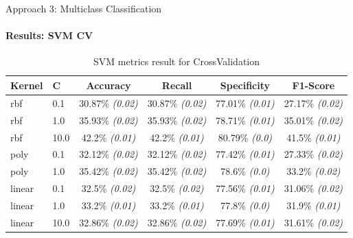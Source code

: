 \documentclass[9pt, pstricks, xcolor=dvipsnames]{beamer}
\begin{document}
\begin{frame}{Approach 3: Multiclass Classification}
\framesubtitle{Results: SVM CV}
\begin{table}[H]
\centering
\begin{tabular}{llcccc}
\toprule
Kernel & C & Accuracy & Recall & Specificity & F1-Score \\
\midrule
rbf & 0.1 & 30.87\% \textit{(0.02)} & 30.87\% \textit{(0.02)} & 77.01\% \textit{(0.01)} & 27.17\% \textit{(0.02)} \\
rbf & 1.0 & 35.93\% \textit{(0.02)} & 35.93\% \textit{(0.02)} & 78.71\% \textit{(0.01)} & 35.01\% \textit{(0.02)} \\
rbf & 10.0 & 42.2\% \textit{(0.01)} & 42.2\% \textit{(0.01)} & 80.79\% \textit{(0.0)} & 41.5\% \textit{(0.01)} \\
poly & 0.1 & 32.12\% \textit{(0.02)} & 32.12\% \textit{(0.02)} & 77.42\% \textit{(0.01)} & 27.33\% \textit{(0.02)} \\
poly & 1.0 & 35.42\% \textit{(0.02)} & 35.42\% \textit{(0.02)} & 78.6\% \textit{(0.0)} & 33.2\% \textit{(0.02)} \\
linear & 0.1 & 32.5\% \textit{(0.02)} & 32.5\% \textit{(0.02)} & 77.56\% \textit{(0.01)} & 31.06\% \textit{(0.02)} \\
linear & 1.0 & 33.2\% \textit{(0.01)} & 33.2\% \textit{(0.01)} & 77.8\% \textit{(0.0)} & 31.9\% \textit{(0.01)} \\
linear & 10.0 & 32.86\% \textit{(0.02)} & 32.86\% \textit{(0.02)} & 77.69\% \textit{(0.01)} & 31.61\% \textit{(0.02)} \\
\bottomrule
\end{tabular}
\caption{SVM metrics result for CrossValidation}
\label{tab:SVM_CV_approach3}
\end{table}
\end{frame}
\end{document}

